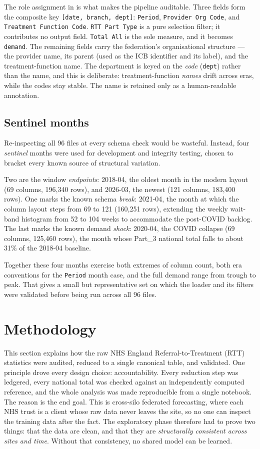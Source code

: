 \documentclass[11pt,a4paper]{article}
\begin{document}
The role assignment in  is what makes the pipeline auditable.
Three fields form the composite key \texttt{[date, branch, dept]}:
\texttt{Period}, \texttt{Provider Org Code}, and \texttt{Treatment Function
Code}. \texttt{RTT Part Type} is a pure selection filter; it contributes no
output field. \texttt{Total All} is the sole measure, and it becomes
\texttt{demand}. The remaining fields carry the federation's organisational
structure --- the provider name, its parent (used as the ICB identifier and its
label), and the treatment-function name. The department is keyed on the
\emph{code} (\texttt{dept}) rather than the name, and this is deliberate:
treatment-function \emph{names} drift across eras, while the codes stay stable.
The name is retained only as a human-readable annotation.

\subsection{Sentinel months}

Re-inspecting all 96 files at every schema check would be wasteful. Instead,
four \emph{sentinel} months were used for development and integrity testing,
chosen to bracket every known source of structural variation.

Two are the window \emph{endpoints}: 2018-04, the oldest month in the modern
layout (69 columns, 196,340 rows), and 2026-03, the newest (121 columns,
183,400 rows). One marks the known schema \emph{break}: 2021-04, the month at
which the column layout steps from 69 to 121 (160,251 rows), extending the
weekly wait-band histogram from 52 to 104 weeks to accommodate the post-COVID
backlog. The last marks the known demand \emph{shock}: 2020-04, the COVID
collapse (69 columns, 125,460 rows), the month whose Part\_3 national total
falls to about 31\% of the 2018-04 baseline.

Together these four months exercise both extremes of column count, both era
conventions for the \texttt{Period} month case, and the full demand range from
trough to peak. That gives a small but representative set on which the loader
and its filters were validated before being run across all 96 files.

\section{Methodology}\label{sec:method}

This section explains how the raw NHS England Referral-to-Treatment (RTT) statistics were audited, reduced to a single canonical table, and validated. One principle drove every design choice: accountability. Every reduction step was ledgered, every national total was checked against an independently computed reference, and the whole analysis was made reproducible from a single notebook. The reason is the end goal. This is cross-silo federated forecasting, where each NHS trust is a client whose raw data never leaves the site, so no one can inspect the training data after the fact. The exploratory phase therefore had to prove two things: that the data are clean, and that they are \emph{structurally consistent across sites and time}. Without that consistency, no shared model can be learned.
\end{document}
